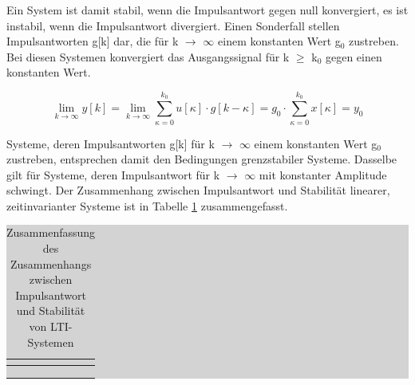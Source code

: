 \noindent Ein System ist damit stabil, wenn die Impulsantwort gegen null konvergiert, es ist instabil, wenn die Impulsantwort divergiert. Einen Sonderfall stellen Impulsantworten g[k] dar, die f\"{u}r k $\mathrm{\to}$ $\mathrm{\infty}$ einem konstanten Wert g${}_{0}$ zustreben. Bei diesen Systemen konvergiert das Ausgangssignal f\"{u}r k $\geq$ k${}_{0}$ gegen einen konstanten Wert.

\begin{equation}\label{eq:fouronehundredone}
{\mathop{\lim }\limits_{k\to \infty }} y\left[k\right]={\mathop{\lim }\limits_{k\to \infty }} \sum _{\kappa =0}^{k_{0} }u\left[\kappa \right]\cdot g\left[k-\kappa \right] =g_{0} \cdot \sum _{\kappa =0}^{k_{0} }x\left[\kappa \right] =y_{0} 
\end{equation}

\noindent Systeme, deren Impulsantworten g[k] f\"{u}r k $\mathrm{\to}$ $\mathrm{\infty}$ einem konstanten Wert g${}_{0}$ zustreben, entsprechen damit den Bedingungen grenzstabiler Systeme. Dasselbe gilt f\"{u}r Systeme, deren Impulsantwort f\"{u}r k $\mathrm{\to}$ $\mathrm{\infty}$ mit konstanter Amplitude schwingt. Der Zusammenhang zwischen Impulsantwort und Stabilit\"{a}t linearer, zeitinvarianter Systeme ist in Tabelle \ref{tab:fourseven} zusammengefasst.

\begin{table}[H]
\setlength{\arrayrulewidth}{.1em}
\caption{Zusammenfassung des Zusammenhangs zwischen Impulsantwort und Stabilit\"{a}t von LTI-Systemen}
\setlength{\fboxsep}{0pt}%
\colorbox{lightgray}{%
%
\begin{tabular}{| c | c |}
\hline
\parbox[c][0.35in][c]{3.3in}{\smallskip\centering\textbf{\selectfont{Eigenschaft}}} & \parbox[c][0.35in][c]{3.3in}{\smallskip\centering\textbf{\selectfont{Bedeutung}}}\\ \hline

\parbox[c][0.4in][c]{3.3in}{} & 
\parbox[c][0.4in][c]{3.3in}{}\\ \hline

\parbox[c][0.8in][c]{3.3in}{} & 
\parbox[c][0.8in][c]{3.3in}{}\\ \hline

\parbox[c][0.4in][c]{3.3in}{} & 
\parbox[c][0.4in][c]{3.3in}{}\\ \hline

\end{tabular}%
}
\label{tab:fourseven}
\end{table}

